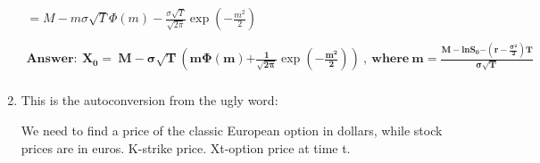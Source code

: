 \documentclass[12pt, a4paper]{article}
\begin{document}
\begin{enumerate}
\[\begin{matrix}
 = M - m\sigma\sqrt{T}\Phi\left( m \right) - \frac{\sigma\sqrt{T}}{\sqrt{2\pi}}\exp\left( - \frac{m^{2}}{2} \right) \\
 \\
\mathbf{Answer:\ }\mathbf{X}_{\mathbf{0}}\mathbf{= \ }\mathbf{M - \sigma}\sqrt{\mathbf{T}}\left( \mathbf{\text{mΦ}}\left( \mathbf{m} \right)\mathbf{+}\frac{\mathbf{1}}{\sqrt{\mathbf{2\pi}}}\exp\left( \mathbf{-}\frac{\mathbf{m}^{\mathbf{2}}}{\mathbf{2}} \right) \right)\mathbf{\ ,\ where\ }\mathbf{m =}\frac{\mathbf{M - ln}\mathbf{S}_{\mathbf{0}}\mathbf{-}\left( \mathbf{r -}\frac{\mathbf{\sigma}^{\mathbf{2}}}{\mathbf{2}} \right)\mathbf{T}}{\mathbf{\sigma}\sqrt{\mathbf{T}}} \\
\end{matrix}\]

\item This is the autoconversion from the ugly word:

We need to find a price of the classic European option in dollars, while
stock prices are in euros. K-strike price. Xt-option price at time t.


\end{enumerate}
\end{document}
